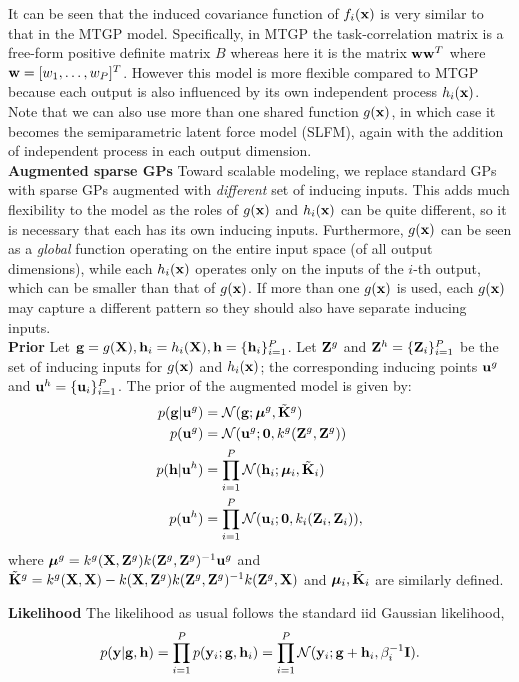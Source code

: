 \documentclass{article} %
\begin{document}
\noindent It can be seen that the induced covariance function of $f_i(\mathbf{x})$ is very similar to that in the MTGP model.
Specifically, in MTGP the task-correlation matrix is a free-form positive definite matrix $B$ whereas here it is the matrix $\mathbf{w} \mathbf{w}^T$ where $\mathbf{w} = [w_1, \hdots, w_P]^T$.
However this model is more flexible compared to MTGP because each output is also influenced by its own independent process $h_i(\mathbf{x})$.
Note that we can also use more than one shared function $g(\mathbf{x})$, in which case it becomes the semiparametric latent force model (SLFM), again with the addition of independent process in each output dimension. \\

\noindent 
\textbf{Augmented sparse GPs}
Toward scalable modeling, we replace standard GPs with sparse GPs augmented with \textit{different} set of inducing inputs.
This adds much flexibility to the model as the roles of $g(\mathbf{x})$ and $h_i(\mathbf{x})$ can be quite different, so it is necessary that each has its own inducing inputs.
Furthermore, $g(\mathbf{x})$ can be seen as a \textit{global} function operating on the entire input space (of all output dimensions), while each $h_i(\mathbf{x})$ operates only on the inputs of the $i$-th output, which can be smaller than that of $g(\mathbf{x})$.
If more than one $g(\mathbf{x})$ is used, each $g(\mathbf{x})$ may capture a different pattern so they should also have separate inducing inputs. \\

\noindent
\textbf{Prior}
\newcommand{\Zg}{\mat{Z}^g}
\newcommand{\Zi}{\mat{Z}_i}
Let $\mathbf{g} = g(\mathbf{X}), \mathbf{h}_i = h_i(\mathbf{X}), \mathbf{h} = \{\mathbf{h}_i \}_{i=1}^P$. Let $\Zg$ and $\mat{Z}^h = \{\Zi \}_{i=1}^P$ be the set of inducing inputs for $g(\mathbf{x})$ and $h_i(\mathbf{x})$; the corresponding inducing points $\mathbf{u}^g$ and $\mathbf{u}^h = \{\mathbf{u}_i \}_{i=1}^P$.
The prior of the augmented model is given by:
\begin{align}
p(\vg | \vu^g) &= \Normal(\vg; \BigMu^g, \tilde{\K}^g )\\
p(\vu^g) &= \Normal(\vu^g; \vec{0}, k^g(\Zg, \Zg)) \\
p(\vh | \vu^h) &= \prod_{i=1}^P \Normal(\vh_i; \BigMu_i, \tilde{\K}_i)\\
p(\vu^h) &= \prod_{i=1}^P \Normal(\vu_i; \vec{0}, k_i(\Zi, \Zi)),
\end{align}
where $\BigMu^g = k^g(\X,\Zg)k(\Zg,\Zg)^{-1}\vu^g$ and $\tilde{\K}^g = k^g(\X,\X) - k(\X,\Zg)k(\Zg,\Zg)^{-1}k(\Zg,\X)$ and $\boldsymbol{\mu}_i, \tilde{\mathbf{K}}_i$ are similarly defined.

\noindent
\textbf{Likelihood}
The likelihood as usual follows the standard iid Gaussian likelihood,
\begin{align}
p(\mathbf{y} | \mathbf{g}, \mathbf{h} ) = \prod_{i=1}^P p( \mathbf{y}_i ; \mathbf{g}, \mathbf{h}_i) = \prod_{i=1}^P \mathcal{N}( \mathbf{y}_i ; \mathbf{g} + \mathbf{h}_i, \beta_i^{-1} \mathbf{I}).
\end{align}
\end{document}
